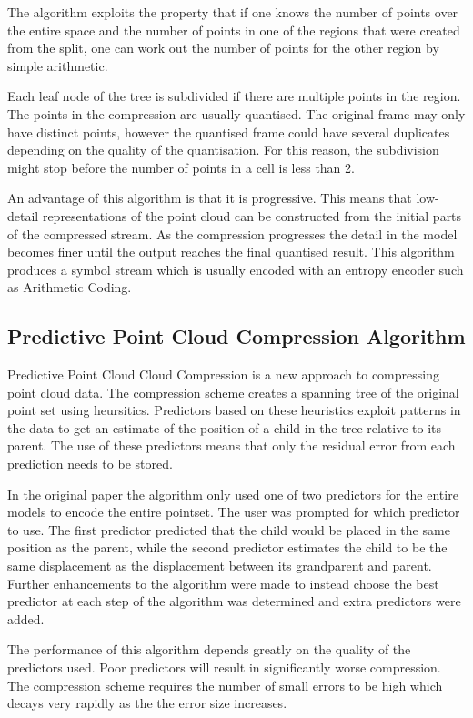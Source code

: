 \documentclass[a4paper,11pt]{report}
\begin{document}
The algorithm exploits the property that if one knows the number of points over the entire space and the number of points in one of the regions that were created from the split, one can work out the number of points for the other region by simple arithmetic.

Each leaf node of the tree is subdivided if there are multiple points in the region. The points in the compression are usually quantised. The original frame may only have distinct points, however the quantised frame could have several duplicates depending on the quality of the quantisation. For this reason, the subdivision might stop before the number of points in a cell is less than 2.

An advantage of this algorithm is that it is progressive. This means that low-detail representations of the point cloud can be constructed from the initial parts of the compressed stream. As the compression progresses the detail in the model becomes finer until the output reaches the final quantised result. This algorithm produces a symbol stream which is usually encoded with an entropy encoder such as Arithmetic Coding.

\subsection{Predictive Point Cloud Compression Algorithm}

Predictive Point Cloud Cloud Compression is a new approach to compressing point cloud data. The compression scheme creates a spanning tree of the original point set using heursitics.\cite{gumholdcomp} Predictors based on these heuristics exploit patterns in the data to get an estimate of the position of a child in the tree relative to its parent. The use of these predictors means that only the residual error from each prediction needs to be stored.

In the original paper the algorithm only used one of two predictors for the entire models to encode the entire pointset. The user was prompted for which predictor to use. The first predictor predicted that the child would be placed in the same position as the parent, while the second predictor estimates the child to be the same displacement as the displacement between its grandparent and parent. Further enhancements to the algorithm were made to instead choose the best predictor at each step of the algorithm was determined and extra predictors were added.\cite{merrycomp}

The performance of this algorithm depends greatly on the quality of the predictors used. Poor predictors will result in significantly worse compression. The compression scheme requires the number of small errors to be high which decays very rapidly as the the error size increases. 
\end{document}
